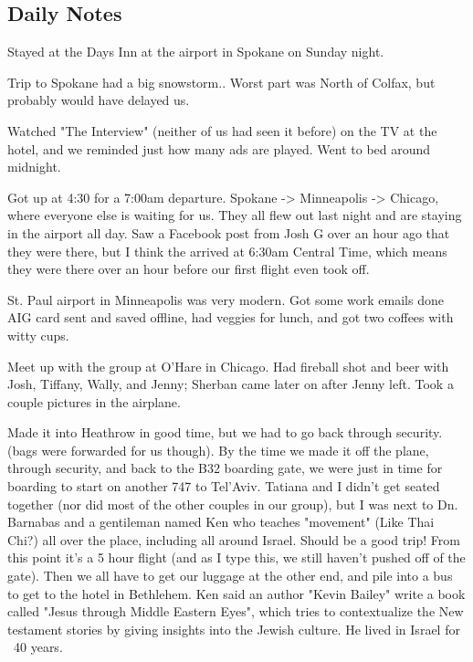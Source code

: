 \documentclass[letterpaper]{report}
\begin{document}
\clearpage
\begin{multicols}{2}
\subsection{Daily Notes}
Stayed at the Days Inn at the airport  in Spokane on Sunday night.

Trip to Spokane had a big snowstorm.. Worst part was North of Colfax, but probably would have delayed us.

Watched "The Interview" (neither of us had seen it before) on the TV at the hotel, and we reminded just how many ads are played. Went to bed around midnight.

Got up at 4:30 for a 7:00am departure. Spokane -> Minneapolis -> Chicago, where everyone else is waiting for us. They all flew out last night and are staying in the airport all day. Saw a Facebook post from Josh G over an hour ago that they were there, but I think the arrived at 6:30am Central Time, which means they were there over an hour before our first flight even took off.

St. Paul airport in Minneapolis was very modern. Got some work emails done AIG card sent and saved offline, had veggies for lunch, and got two coffees with witty cups.

Meet up with the group at O'Hare in Chicago. Had fireball shot and beer with Josh, Tiffany, Wally, and Jenny; Sherban came later on after Jenny left. Took a couple pictures in the airplane.

Made it into Heathrow in good time, but we had to go back through security.  (bags were forwarded for us though).
By the time we made it off the plane, through security, and back to the B32 boarding gate, we were just in time for boarding to start on another 747 to Tel'Aviv.  Tatiana and I didn't get seated together (nor did most of the other couples in our group), but I was next to Dn. Barnabas and a gentileman named Ken who teaches "movement" (Like Thai Chi?) all over the place, including all around Israel. Should be a good trip!   From this point it's a 5 hour flight (and as I type this, we still haven't pushed off of the gate).  Then we all have to get our luggage at the other end, and pile into a bus to get to the hotel in Bethlehem.
Ken said an author "Kevin Bailey" write a book called "Jesus through Middle Eastern Eyes", which tries to contextualize the New testament stories by giving insights into the Jewish culture. He lived in Israel for ~40 years.
\end{multicols}
\end{document}

